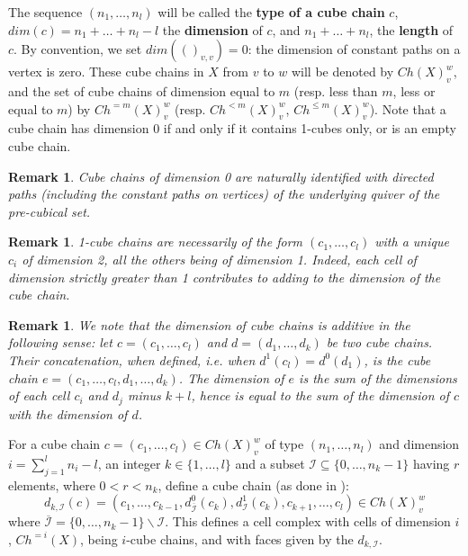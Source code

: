 \documentclass{article}
\newtheorem{remark}[definition]{Remark} %
\newcommand\look[1]{{\bf #1}}
\begin{document}
The sequence $(n_1,\ldots,n_l)$ will be called the \look{type of a cube chain} $c$, $dim(c) = n_1 + \ldots + n_l - l$ the \look{dimension} of $c$, and $n_1 + \ldots + n_l$, the \look{length} of $c$. By convention, we set $dim(()_{v,v})=0$: the dimension of constant paths on a vertex is zero. These cube chains in $X$ from $v$ to $w$ will be denoted by $Ch(X)^w_v$, and the set of cube chains of dimension equal to $m$ (resp. less than $m$, less or equal to $m$) by $Ch^{=m}(X)^w_v$ (resp. $Ch^{<m}(X)^w_v$, $Ch^{\leq m}(X)^w_v$). Note that a cube chain has dimension 0 if and only if it contains 1-cubes only, or is an empty cube chain. 

\begin{remark}
\label{rem:0cubechain}
Cube chains of dimension 0 are naturally identified with directed paths (including the constant paths on vertices) of the underlying quiver of the pre-cubical set. 
\end{remark}

\begin{remark}
\label{rem:1cubechain}
1-cube chains are necessarily of the form $(c_1,\ldots,c_l)$ with a unique $c_i$ of dimension 2, all the others being of dimension 1. Indeed, each cell of dimension strictly greater than 1 contributes to adding to the dimension of the cube chain. 
\end{remark}

\begin{remark}
\label{rem:dimension}
We note that the dimension of cube chains is additive in the following sense: let $c=(c_1,\ldots,c_l)$ and $d=(d_1,\ldots,d_k)$ be two cube chains. Their concatenation, when defined, i.e. when $d^1(c_l)=d^0(d_1)$, is the cube chain $e=(c_1,\ldots,c_l,d_1,\ldots,d_k)$. The dimension of $e$ is the sum of the dimensions of each cell $c_i$ and $d_j$ minus $k+l$, hence is equal to the sum of the dimension of $c$ with the dimension of $d$. 
\end{remark}

For a cube chain $c = (c_1,\ldots,c_l) \in Ch(X)^w_v$ of type $(n_1,\ldots,n_l)$ and dimension $i=\sum\limits_{j=1}^l n_i-l$, an integer $k \in \{1,\ldots,l\}$ and a subset $\mathcal{I} \subseteq \{0,\ldots,n_k-1\}$ having $r$ elements, where $0 < r < n_k$, define a cube chain (as done in \cite{cubechains}):
$$
d_{k,\mathcal{I}}(c) = (c_1,\ldots,c_{k-1},d^0_{\overline{\mathcal{I}}}(c_k),d^1_\mathcal{I}(c_k),c_{k+1},\ldots,c_l) \in Ch(X)^w_v$$ 
\noindent where $\overline{\mathcal{I}} = \{0,\ldots,n_k-1\} \backslash \mathcal{I}$. %
This defines a cell complex with cells of dimension $i$, $Ch^{=i}(X)$, being $i$-cube chains, and with faces given by the $d_{k,\mathcal{I}}$. 
\end{document}
